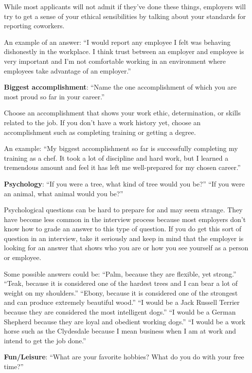 While most applicants will not admit if they've done these things, employers will try to get a sense of your ethical sensibilities by talking about your standards for reporting coworkers. 

An example of an answer:
\break ``I would report any employee I felt was behaving dishonestly in the workplace. I think trust between an employer and employee is very important and I'm not comfortable working in an environment where employees take advantage of an employer.''
 
\textbf{Biggest accomplishment}: 
\break ``Name the one accomplishment of which you are most proud so far in your career.''

Choose an accomplishment that shows your work ethic, determination, or skills related to the job. If you don't have a work history yet, choose an accomplishment such as completing training or getting a degree. 

An example:
\break ``My biggest accomplishment so far is successfully completing my training as a chef. It took a lot of discipline and hard work, but I learned a tremendous amount and feel it has left me well-prepared for my chosen career.''

\textbf{Psychology}: ``If you were a tree, what kind of tree would you be?'' ``If you were an animal, what animal would you be?''

Psychological questions can be hard to prepare for and may seem strange. They have become less common in the interview process because most employers don't know how to grade an answer to this type of question. If you do get this sort of question in an interview, take it seriously and keep in mind that the employer is looking for an answer that shows who you are or how you see yourself as a person or employee. 

Some possible answers could be:
\break ``Palm, because they are flexible, yet strong.''
\break ``Teak, because it is considered one of the hardest trees and I can bear a lot of weight on my shoulders.'' 
\break ``Ebony, because it is considered one of the strongest and can produce extremely beautiful wood.''
\break ``I would be a Jack Russell Terrier because they are considered the most intelligent dogs.'' 
\break ``I would be a German Shepherd because they are loyal and obedient working dogs.''
\break ``I would be a work horse such as the Clydesdale because I mean business when I am at work and intend to get the job done.''

\textbf{Fun/Leisure}: 
\break ``What are your favorite hobbies? What do you do with your free time?''

